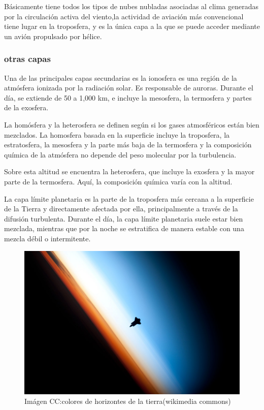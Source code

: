 \documentclass{article} %
\begin{document}
 Básicamente tiene todos los tipos de nubes nubladas asociadas al clima generadas por la circulación activa del viento,la actividad de aviación más convencional tiene lugar en la troposfera, y es la única capa a la que se puede acceder mediante un avión propulsado por hélice.

\subsubsection{otras capas}

Una de las principales capas secundarias es la ionosfera es una región de la atmósfera ionizada por la radiación solar. Es responsable de auroras. Durante el día, se extiende de 50 a 1,000 km, e incluye la mesosfera, la termosfera y partes de la exosfera.

La homósfera y la heterosfera se definen según si los gases atmosféricos están bien mezclados. La homosfera basada en la superficie incluye la troposfera, la estratosfera, la mesosfera y la parte más baja de la termosfera y la  composición química de la atmósfera no depende del peso molecular por la turbulencia.

Sobre esta altitud se encuentra la heterosfera, que incluye la exosfera y la mayor parte de la termosfera. Aquí, la composición química varía con la altitud.

La capa límite planetaria es la parte de la troposfera más cercana a la superficie de la Tierra y directamente afectada por ella, principalmente a través de la difusión turbulenta. Durante el día, la capa límite planetaria suele estar bien mezclada, mientras que por la noche se estratifica de manera estable con una mezcla débil o intermitente.

\begin{figure}[ht!]
  \includegraphics[width=\linewidth]{cielo2.jpg}
  \caption{Imágen CC:colores de horizontes de la tierra(wikimedia commons)}
  \label{fig:cielo2}
\end{figure}
\end{document}
